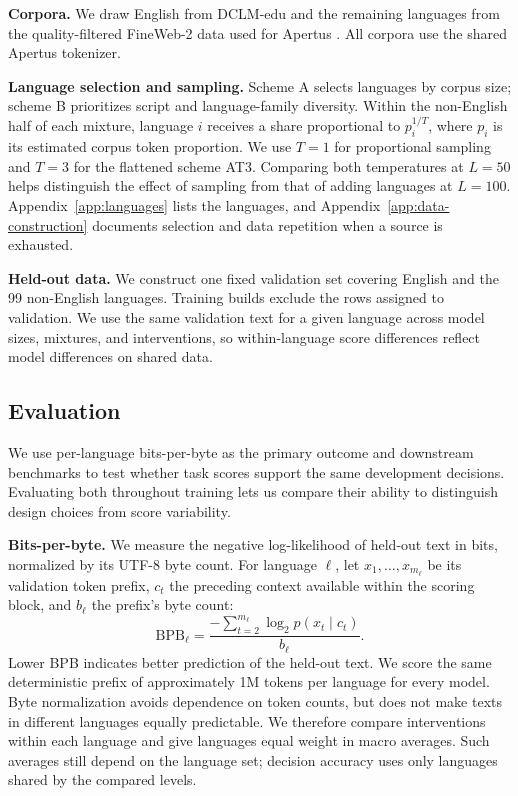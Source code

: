 \textbf{Corpora.} We draw English from DCLM-edu \citep{li_datacomp-lm_2025} and the remaining languages from the quality-filtered FineWeb-2 data used for Apertus \citep{penedo_fineweb2_2025, messmer_enhancing_2026, apertus_apertus_2025}. All corpora use the shared Apertus tokenizer.

\textbf{Language selection and sampling.} Scheme A selects languages by corpus size; scheme B prioritizes script and language-family diversity. Within the non-English half of each mixture, language $i$ receives a share proportional to $p_i^{1/T}$, where $p_i$ is its estimated corpus token proportion. We use $T=1$ for proportional sampling and $T=3$ for the flattened scheme AT3. Comparing both temperatures at $L=50$ helps distinguish the effect of sampling from that of adding languages at $L=100$. Appendix~\ref{app:languages} lists the languages, and Appendix~\ref{app:data-construction} documents selection and data repetition when a source is exhausted.

\textbf{Held-out data.} We construct one fixed validation set covering English and the 99 non-English languages. Training builds exclude the rows assigned to validation. We use the same validation text for a given language across model sizes, mixtures, and interventions, so within-language score differences reflect model differences on shared data.

\subsection{Evaluation}
\label{subsec:evaluation}

We use per-language bits-per-byte as the primary outcome and downstream benchmarks to test whether task scores support the same development decisions. Evaluating both throughout training lets us compare their ability to distinguish design choices from score variability.

\textbf{Bits-per-byte.} We measure the negative log-likelihood of held-out text in bits, normalized by its UTF-8 byte count. For language $\ell$, let $x_1,\ldots,x_{m_\ell}$ be its validation token prefix, $c_t$ the preceding context available within the scoring block, and $b_\ell$ the prefix's byte count:
\begin{equation}
\mathrm{BPB}_\ell = \frac{-\sum_{t=2}^{m_\ell}\log_2 p(x_t \mid c_t)}{b_\ell}.
\label{eq:bpb}
\end{equation}
Lower BPB indicates better prediction of the held-out text. We score the same deterministic prefix of approximately 1M tokens per language for every model. Byte normalization avoids dependence on token counts, but does not make texts in different languages equally predictable. We therefore compare interventions within each language and give languages equal weight in macro averages. Such averages still depend on the language set; decision accuracy uses only languages shared by the compared levels.

